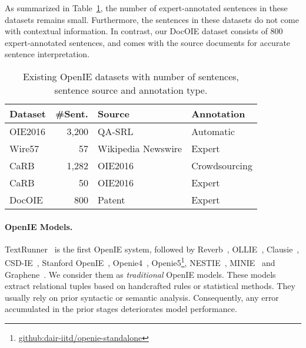 \documentclass[11pt,a4paper]{article}
\newcommand{\dname}{DocOIE\xspace}
\begin{document}
As summarized in Table~\ref{tab:dataset_stats}, the number of expert-annotated sentences in these datasets remains small. Furthermore, the sentences in these datasets do not come with contextual information. In contrast, our \dname dataset consists of 800 expert-annotated sentences, and comes with the source documents for accurate sentence interpretation. 


\begin{table}[t]
\centering
\begin{tabular}{l|rp{0.55in}l}
 \toprule
 Dataset & \#Sent. & Source & Annotation\\
 \midrule
 OIE2016 & 3,200& QA-SRL & Automatic \\
 Wire57 & 57 & Wikipedia Newswire & Expert \\
 CaRB & 1,282 & OIE2016 & Crowdsourcing\\
 CaRB & 50 & OIE2016 & Expert\\
 \midrule
 \dname & 800 & Patent & Expert\\
 \bottomrule
\end{tabular}
\caption{Existing OpenIE datasets with number of sentences, sentence source and annotation type.}
\vspace{-1em}
\label{tab:dataset_stats}
\end{table}



\paragraph{OpenIE Models.} TextRunner~\cite{yates2007textrunner} is the first OpenIE system, followed by Reverb~\cite{fader2011identifying}, OLLIE~\cite{schmitz2012open}, Clausie~\cite{del2013clausie}, CSD-IE~\cite{bast2013open}, Stanford OpenIE~\cite{angeli2015leveraging}, Openie4~\cite{mausam2016open}, Openie5\footnote{\url{github:dair-iitd/openie-standalone}}, NESTIE~\cite{bhutani2016nested}, MINIE~\cite{gashteovski2017minie} and Graphene~\cite{cetto2018graphene}. We consider them as \textit{traditional} OpenIE models. These models extract relational tuples based on handcrafted rules or statistical methods. They usually rely on prior syntactic or semantic analysis. Consequently, any error accumulated in the prior stages deteriorates model performance.
\end{document}
